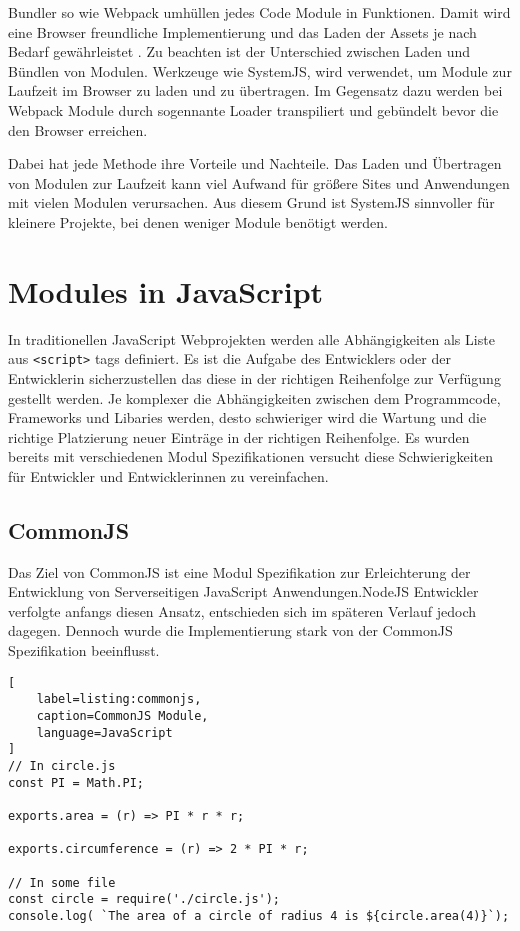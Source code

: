 Bundler so wie Webpack umhüllen jedes Code Module in Funktionen. Damit wird eine Browser freundliche Implementierung und das Laden der Assets je nach Bedarf gewährleistet \autocite{RichHarris}. Zu beachten ist der Unterschied zwischen Laden und Bündlen von Modulen. Werkzeuge wie SystemJS, wird verwendet, um Module zur Laufzeit im Browser zu laden und zu übertragen. Im Gegensatz dazu werden bei Webpack Module durch sogennante Loader transpiliert und gebündelt bevor die den Browser erreichen. \autocite{WebpackComparison}

Dabei hat jede Methode ihre Vorteile und Nachteile. Das Laden und Übertragen von Modulen zur Laufzeit kann viel Aufwand für größere Sites und Anwendungen mit vielen Modulen verursachen. Aus diesem Grund ist SystemJS sinnvoller für kleinere Projekte, bei denen weniger Module benötigt werden. \autocite{WebpackComparison}

\section{Modules in JavaScript}
\label{section:modules_in_javaScript}
In traditionellen JavaScript Webprojekten werden alle Abhängigkeiten als Liste aus \lstinline{<script>} tags definiert. Es ist die Aufgabe des Entwicklers oder der Entwicklerin sicherzustellen das diese in der richtigen Reihenfolge zur Verfügung gestellt werden. Je komplexer die Abhängigkeiten zwischen dem  Programmcode, Frameworks und Libaries werden, desto schwieriger wird die Wartung und die richtige Platzierung neuer Einträge in der richtigen Reihenfolge. Es wurden bereits mit verschiedenen Modul Spezifikationen versucht diese Schwierigkeiten für Entwickler und Entwicklerinnen zu vereinfachen. \autocite{SebastianPeyrott}

\subsection{CommonJS}
Das Ziel von CommonJS ist eine Modul Spezifikation zur Erleichterung der Entwicklung von Serverseitigen JavaScript Anwendungen.NodeJS Entwickler verfolgte anfangs diesen Ansatz, entschieden sich im späteren Verlauf jedoch dagegen. Dennoch wurde die Implementierung stark von der CommonJS Spezifikation beeinflusst. \autocite{SebastianPeyrott}

\begin{lstlisting}[
    label=listing:commonjs,
	caption=CommonJS Module,
	language=JavaScript
]
// In circle.js
const PI = Math.PI;

exports.area = (r) => PI * r * r;

exports.circumference = (r) => 2 * PI * r;

// In some file
const circle = require('./circle.js');
console.log( `The area of a circle of radius 4 is ${circle.area(4)}`);
\end{lstlisting}

